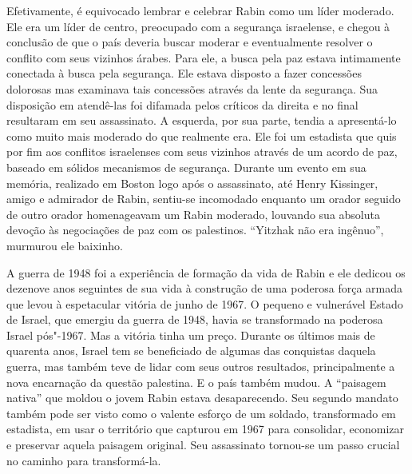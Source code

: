 Efetivamente, é equivocado lembrar e celebrar Rabin como um líder
moderado. Ele era um líder de centro, preocupado com a segurança
israelense, e chegou à conclusão de que o país deveria buscar moderar e
eventualmente resolver o conflito com seus vizinhos árabes. Para ele, a
busca pela paz estava intimamente conectada à busca pela segurança. Ele
estava disposto a fazer concessões dolorosas mas examinava tais
concessões através da lente da segurança. Sua disposição em atendê-las
foi difamada pelos críticos da direita e no final resultaram em seu
assassinato. A esquerda, por sua parte, tendia a apresentá-lo como muito
mais moderado do que realmente era. Ele foi um estadista que quis por
fim aos conflitos israelenses com seus vizinhos através de um acordo de
paz, baseado em sólidos mecanismos de segurança. Durante um evento em
sua memória, realizado em Boston logo após o assassinato, até Henry
Kissinger, amigo e admirador de Rabin, sentiu-se incomodado enquanto um orador
seguido de outro orador homenageavam um Rabin moderado, louvando sua absoluta devoção
às negociações de paz com os palestinos. ``Yitzhak não era ingênuo'',
murmurou ele baixinho.


A guerra de 1948 foi a experiência de formação da vida de Rabin e ele
dedicou os dezenove anos seguintes de sua vida à construção de uma poderosa
força armada que levou à espetacular vitória de junho de 1967. O pequeno
e vulnerável Estado de Israel, que emergiu da guerra de 1948, havia se
transformado na poderosa Israel pós"-1967. Mas a vitória tinha um preço.
Durante os últimos mais de quarenta anos, Israel tem se beneficiado de
algumas das conquistas daquela guerra, mas também teve de lidar com
seus outros resultados, principalmente a nova encarnação da questão
palestina. E o país também mudou. A ``paisagem nativa'' que moldou o
jovem Rabin estava desaparecendo. Seu segundo mandato também pode ser
visto como o valente esforço de um soldado, transformado em estadista,
em usar o território que capturou em 1967 para consolidar, economizar e
preservar aquela paisagem original. Seu assassinato tornou-se um passo
crucial no caminho para transformá-la.

